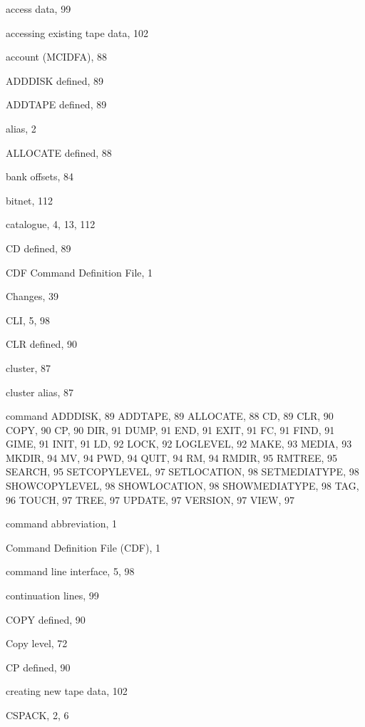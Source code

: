 \begin{theindex}

  \item access data, 99
  \item accessing existing tape data, 102
  \item account (MCIDFA), 88
  \item ADDDISK
    \subitem defined, 89
  \item ADDTAPE
    \subitem defined, 89
  \item alias, 2
  \item ALLOCATE
    \subitem defined, 88

  \indexspace

  \item bank offsets, 84
  \item bitnet, 112

  \indexspace

  \item catalogue, 4, 13, 112
  \item CD
    \subitem defined, 89
  \item CDF Command Definition File, 1
  \item Changes, 39
  \item CLI, 5, 98
  \item CLR
    \subitem defined, 90
  \item cluster, 87
  \item cluster alias, 87
  \item command
    \subitem ADDDISK, 89
    \subitem ADDTAPE, 89
    \subitem ALLOCATE, 88
    \subitem CD, 89
    \subitem CLR, 90
    \subitem COPY, 90
    \subitem CP, 90
    \subitem DIR, 91
    \subitem DUMP, 91
    \subitem END, 91
    \subitem EXIT, 91
    \subitem FC, 91
    \subitem FIND, 91
    \subitem GIME, 91
    \subitem INIT, 91
    \subitem LD, 92
    \subitem LOCK, 92
    \subitem LOGLEVEL, 92
    \subitem MAKE, 93
    \subitem MEDIA, 93
    \subitem MKDIR, 94
    \subitem MV, 94
    \subitem PWD, 94
    \subitem QUIT, 94
    \subitem RM, 94
    \subitem RMDIR, 95
    \subitem RMTREE, 95
    \subitem SEARCH, 95
    \subitem SETCOPYLEVEL, 97
    \subitem SETLOCATION, 98
    \subitem SETMEDIATYPE, 98
    \subitem SHOWCOPYLEVEL, 98
    \subitem SHOWLOCATION, 98
    \subitem SHOWMEDIATYPE, 98
    \subitem TAG, 96
    \subitem TOUCH, 97
    \subitem TREE, 97
    \subitem UPDATE, 97
    \subitem VERSION, 97
    \subitem VIEW, 97
  \item command abbreviation, 1
  \item Command Definition File (CDF), 1
  \item command line interface, 5, 98
  \item continuation lines, 99
  \item COPY
    \subitem defined, 90
  \item Copy level, 72
  \item CP
    \subitem defined, 90
  \item creating new tape data, 102
  \item CSPACK, 2, 6


\end{theindex}
